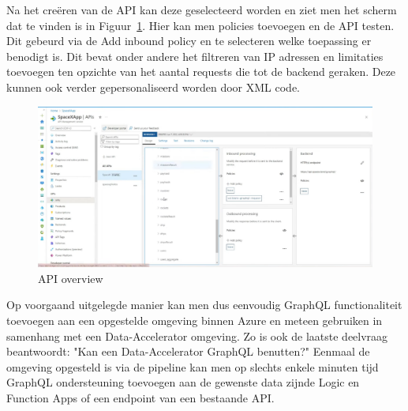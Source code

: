 Na het creëren van de API kan deze geselecteerd worden en ziet men het scherm dat te vinden is in Figuur~\ref{fig:API}. Hier kan men policies toevoegen en de API testen. Dit gebeurd via de Add inbound policy en te selecteren welke toepassing er benodigt is. Dit bevat onder andere het filtreren van IP adressen en limitaties toevoegen ten opzichte van het aantal requests die tot de backend geraken. Deze kunnen ook verder gepersonaliseerd worden door XML code.

\begin{figure}
    \centering
    \includegraphics[scale=0.40]{../img/API.png}
    \caption{\label{fig:API}API overview}
\end{figure}

Op voorgaand uitgelegde manier kan men dus eenvoudig GraphQL functionaliteit toevoegen aan een opgestelde omgeving binnen Azure en meteen gebruiken in samenhang met een Data-Accelerator omgeving. Zo is ook de laatste deelvraag beantwoordt: "Kan een Data-Accelerator GraphQL benutten?" Eenmaal de omgeving opgesteld is via de pipeline kan men op slechts enkele minuten tijd GraphQL ondersteuning toevoegen aan de gewenste data zijnde Logic en Function Apps of een endpoint van een bestaande API.




